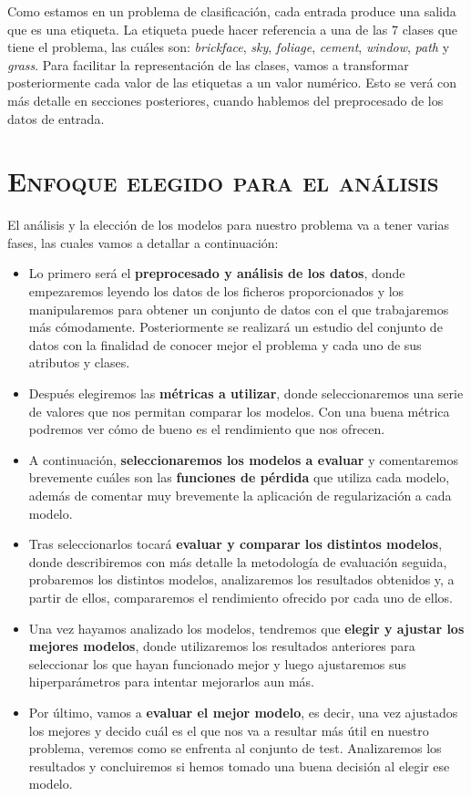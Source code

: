 \documentclass[11pt,a4paper]{article}
\begin{document}
Como estamos en un problema de clasificación, cada entrada produce una salida que es una etiqueta. La etiqueta puede hacer
referencia a una de las 7 clases que tiene el problema, las cuáles son: \textit{brickface}, \textit{sky},
\textit{foliage}, \textit{cement}, \textit{window}, \textit{path} y \textit{grass}. Para facilitar la representación de
las clases, vamos a transformar posteriormente cada valor de las etiquetas a un valor numérico. Esto se verá con más
detalle en secciones posteriores, cuando hablemos del preprocesado de los datos de entrada.

\newpage

\section{\textsc{Enfoque elegido para el análisis}}

El análisis y la elección de los modelos para nuestro problema va a tener varias fases, las cuales vamos a detallar a continuación:
\begin{itemize}[label=\textbullet]
\item Lo primero será el \textbf{preprocesado y análisis de los datos}, donde empezaremos leyendo los datos de los ficheros
proporcionados y los manipularemos para obtener un conjunto de datos con el que trabajaremos más cómodamente. Posteriormente se realizará
un estudio del conjunto de datos con la finalidad de conocer mejor el problema y cada uno de sus atributos y clases.
\item Después elegiremos las \textbf{métricas a utilizar}, donde seleccionaremos una serie de valores que nos permitan comparar los modelos.
Con una buena métrica podremos ver cómo de bueno es el rendimiento que nos ofrecen.
\item A continuación, \textbf{seleccionaremos los modelos a evaluar } y comentaremos brevemente cuáles son las \textbf{funciones de pérdida}
que utiliza cada modelo, además de comentar muy brevemente la aplicación de regularización a cada modelo.
\item Tras seleccionarlos tocará \textbf{evaluar y comparar los distintos modelos}, donde describiremos con más detalle la metodología
de evaluación seguida, probaremos los distintos modelos, analizaremos los resultados obtenidos y, a partir de ellos, compararemos el
rendimiento ofrecido por cada uno de ellos.
\item Una vez hayamos analizado los modelos, tendremos que \textbf{elegir y ajustar los mejores modelos}, donde utilizaremos los resultados
anteriores para seleccionar los que hayan funcionado mejor y luego ajustaremos sus hiperparámetros para intentar mejorarlos aun más.
\item Por último, vamos a \textbf{evaluar el mejor modelo}, es decir, una vez ajustados los mejores y decido cuál es el que nos va a resultar
más útil en nuestro problema, veremos como se enfrenta al conjunto de test. Analizaremos los resultados y concluiremos si hemos tomado una
buena decisión al elegir ese modelo.
\end{itemize}
\end{document}
